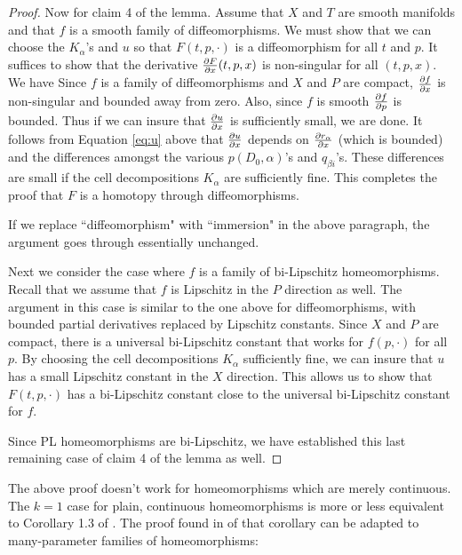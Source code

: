 \begin{proof}
\medskip

Now for claim 4 of the lemma.
Assume that $X$ and $T$ are smooth manifolds and that $f$ is a smooth family of diffeomorphisms.
We must show that we can choose the $K_\alpha$'s and $u$ so that $F(t, p, \cdot)$ is a 
diffeomorphism for all $t$ and $p$.
It suffices to 
show that the derivative $\frac{\partial F}{\partial x}(t, p, x)$ is non-singular for all $(t, p, x)$.
We have
Since $f$ is a family of diffeomorphisms and $X$ and $P$ are compact, 
$\frac{\partial f}{\partial x}$ is non-singular and bounded away from zero.
Also, since $f$ is smooth $\frac{\partial f}{\partial p}$ is bounded.
Thus if we can insure that $\frac{\partial u}{\partial x}$ is sufficiently small, we are done.
It follows from Equation \eqref{eq:u} above that $\frac{\partial u}{\partial x}$ depends on $\frac{\partial r_\alpha}{\partial x}$
(which is bounded)
and the differences amongst the various $p(D_0,\alpha)$'s and $q_{\beta i}$'s.
These differences are small if the cell decompositions $K_\alpha$ are sufficiently fine.
This completes the proof that $F$ is a homotopy through diffeomorphisms.

If we replace ``diffeomorphism" with ``immersion" in the above paragraph, the argument goes
through essentially unchanged.

Next we consider the case where $f$ is a family of bi-Lipschitz homeomorphisms.
Recall that we assume that $f$ is Lipschitz in the $P$ direction as well.
The argument in this case is similar to the one above for diffeomorphisms, with
bounded partial derivatives replaced by Lipschitz constants.
Since $X$ and $P$ are compact, there is a universal bi-Lipschitz constant that works for 
$f(p, \cdot)$ for all $p$.
By choosing the cell decompositions $K_\alpha$ sufficiently fine,
we can insure that $u$ has a small Lipschitz constant in the $X$ direction.
This allows us to show that $F(t, p, \cdot)$ has a bi-Lipschitz constant
close to the universal bi-Lipschitz constant for $f$.

Since PL homeomorphisms are bi-Lipschitz, we have established this last remaining case of claim 4 of the lemma as well.
\end{proof}



The above proof doesn't work for homeomorphisms which are merely continuous.
The $k=1$ case for plain, continuous homeomorphisms 
is more or less equivalent to Corollary 1.3 of \cite{MR0283802}.
The proof found in \cite{MR0283802} of that corollary can be adapted to many-parameter families of
homeomorphisms:

